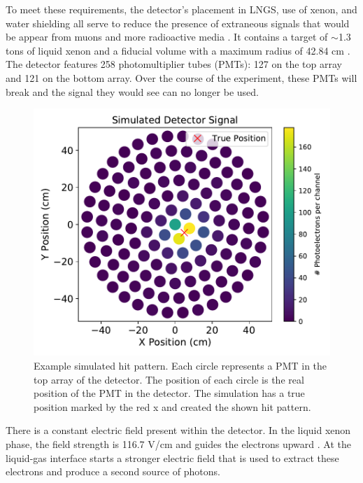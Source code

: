 \documentclass[../thesis.tex]{subfiles}
\begin{document}
To meet these requirements, the detector's placement in LNGS, use of xenon, and water shielding all serve to reduce the presence of extraneous signals that would be appear from muons and more radioactive media \cite{Xenon1t}.
It contains a target of $\sim$1.3 tons of liquid xenon and a fiducial volume with a maximum radius of 42.84 cm \cite{1TDM_DataAnalysis}.
The detector features 258 photomultiplier tubes (PMTs): 127 on the top array and 121 on the bottom array.
Over the course of the experiment, these PMTs will break and the signal they would see can no longer be used.
\begin{figure}
	\centering
	\includegraphics[width=\linewidth]{figures/opt_sim_hit_989.pdf}
	\caption{Example simulated hit pattern.
	Each circle represents a PMT in the top array of the detector.
	The position of each circle is the real position of the PMT in the detector.
	The simulation has a true position marked by the red x and created the shown hit pattern.}
	\label{fig:example_hit}
\end{figure}

\par There is a constant electric field present within the detector.
In the liquid xenon phase, the field strength is 116.7 V/cm and guides the electrons upward \cite{Xenon1t}.
At the liquid-gas interface starts a stronger electric field that is used to extract these electrons and produce a second source of photons.
\end{document}

